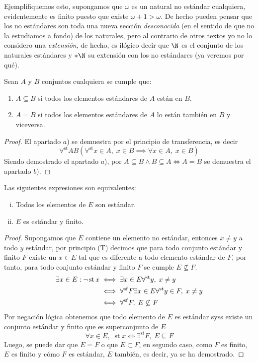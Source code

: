 \documentclass[11pt,oneside,a4paper]{book}
\DeclareMathOperator{\st}{st}
\newcommand{\existsst}{\exists^{\st}}
\newcommand{\forallst}{\forall^{\st}}
\newcommand{\forallsf}{\forall^{\rm sf}}
\begin{document}
Ejemplifiquemos esto, supongamos que $\omega$ es un natural no estándar cualquiera, evidentemente es finito puesto que existe $\omega+1\gt\omega$. De hecho pueden pensar que los no estándares son toda una nueva sección \textit{desconocida} (en el sentido de que no la estudiamos a fondo) de los naturales, pero al contrario de otros textos yo no lo considero una \textit{extensión}, de hecho, es ilógico decir que $\N$ es el conjunto de los naturales estándares y $*\N$ su extensión con los no estándares (ya veremos por qué).
\begin{thm}\label{thm:std-equal}
Sean $A$ y $B$ conjuntos cualquiera se cumple que:
\begin{enumerate}[$a$)]
\item $A\subseteq B$ si todos los elementos estándares de $A$ están en $B$.
\item $A=B$ si todos los elementos estándares de $A$ lo están también en $B$ y viceversa.
\end{enumerate}
\end{thm}
\begin{proof}
El apartado $a$) se demuestra por el principio de transferencia, es decir
$$\forallst AB(\forallst x\in A,\;x\in B\implies\forall x\in A,\;x\in B)$$
Siendo demostrado el apartado $a$), por $A\subseteq B\wedge B\subseteq A\iff A=B$ se demuestra el apartado $b$).
\end{proof}
\begin{thm}
Las siguientes expresiones son equivalentes:
\begin{enumerate}[i)]
\item Todos los elementos de $E$ son estándar.
\item $E$ es estándar y finito.
\end{enumerate}
\end{thm}
\begin{proof}
Supongamos que $E$ contiene un elemento no estándar, entonces $x\neq y$ a todo $y$ estándar, por principio (T) decimos que para todo conjunto estándar y finito $F$ existe un $x\in E$ tal que es diferente a todo elemento estándar de $F$, por tanto, para todo conjunto estándar y finito $F$ se cumple $E\not\subseteq F$.
\begin{align*}
\exists x\in E:\neg\st x &\iff\exists x\in E\forallst y,\;x\neq y\\
&\iff\forallsf F\exists x\in E\forallst y\in F,\;x\neq y\\
&\iff\forallsf F,\;E\not\subseteq F
\end{align*}
Por negación lógica obtenemos que todo elemento de $E$ es estándar syss existe un conjunto estándar y finito que es superconjunto de $E$
$$\forall x\in E,\;\st x\iff\existsst F,\;E\subseteq F$$
Luego, se puede dar que $E=F$ o que $E\subset F$, en segundo caso, como $F$ es finito, $E$ es finito y cómo $F$ es estándar, $E$ también, es decir, ya se ha demostrado.
\end{proof}
\end{document}
